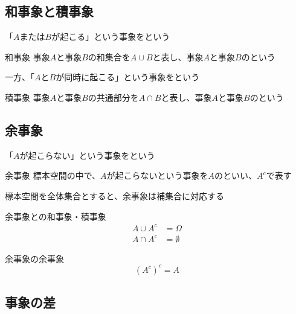 \documentclass[../../../topic_probability-statistics]{subfiles}
\begin{document}
\subsection{和事象と積事象}

「$A$または$B$が起こる」という事象をという

\begin{definition}{和事象}
  事象$A$と事象$B$の和集合を$A \cup B$と表し、事象$A$と事象$B$のという
\end{definition}

\br

一方、「$A$と$B$が同時に起こる」という事象をという

\begin{definition}{積事象}
  事象$A$と事象$B$の共通部分を$A \cap B$と表し、事象$A$と事象$B$のという
\end{definition}

\subsection{余事象}

「$A$が起こらない」という事象をという

\begin{definition}{余事象}
  標本空間の中で、$A$が起こらないという事象を$A$のといい、$A^c$で表す
\end{definition}

\br

標本空間を全体集合とすると、余事象は補集合に対応する

\begin{theorem}{余事象との和事象・積事象}
  \begin{align*}
    A \cup A^c & = \Omega    \\
    A \cap A^c & = \emptyset
  \end{align*}
\end{theorem}

\begin{theorem}{余事象の余事象}
  \begin{equation*}
    (A^c)^c = A
  \end{equation*}
\end{theorem}

\subsection{事象の差}
\end{document}
